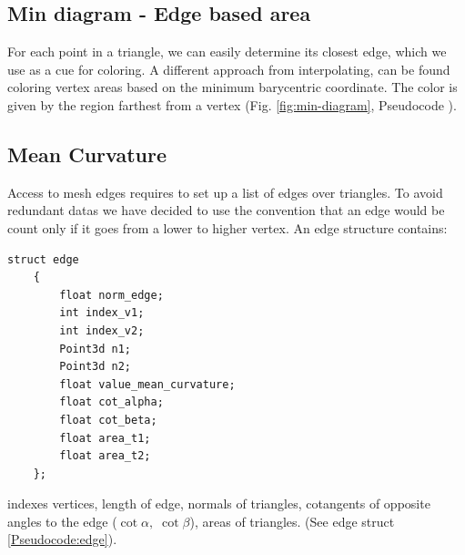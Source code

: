 \subsection{Min diagram - Edge based area} \label{section:max-diagram}
For each point in a triangle, we can easily determine its closest edge, which we use as a cue for coloring.
A different approach from interpolating, can be found coloring vertex areas based on the minimum barycentric coordinate.
The color is given by the region farthest from a vertex (Fig. \ref{fig:min-diagram}, Pseudocode \color{red}{insert Pseudocode}\color{black}).

\subsection{Mean Curvature}
Access to mesh edges requires to set up a list of edges over triangles. To avoid redundant datas we have decided to use the convention that an edge would be count only if it goes from a lower to higher vertex. An edge structure contains:
\begin{lstlisting}[caption={Edge structure}]
    struct edge
    {
        float norm_edge;
        int index_v1;
        int index_v2;
        Point3d n1;
        Point3d n2;
        float value_mean_curvature;
        float cot_alpha;
        float cot_beta;
        float area_t1;
        float area_t2;
    };
\end{lstlisting} \label{Pseudocode:edge}

indexes vertices, length of edge, normals of triangles, cotangents of opposite angles to the edge ($\cot \alpha,\; \cot \beta$), areas of triangles. (See edge struct \ref{Pseudocode:edge}).

